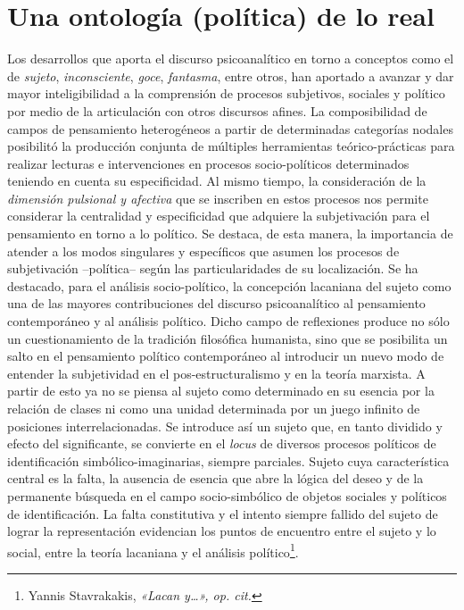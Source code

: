 \section{Una ontología (política) de lo real}

Los desarrollos que aporta el discurso psicoanalítico en torno a conceptos como el de \emph{sujeto}, \emph{inconsciente}, \emph{goce}, \emph{fantasma}, entre otros, han aportado a avanzar y dar mayor inteligibilidad a la comprensión de procesos subjetivos, sociales y político por medio de la articulación con otros discursos afines. La composibilidad de campos de pensamiento heterogéneos a partir de determinadas categorías nodales posibilitó la producción conjunta de múltiples herramientas teórico-prácticas para realizar lecturas e intervenciones en procesos socio-políticos determinados teniendo en cuenta su especificidad. Al mismo tiempo, la consideración de la \emph{dimensión pulsional y afectiva} que se inscriben en estos procesos nos permite considerar la centralidad y especificidad que adquiere la subjetivación para el pensamiento en torno a lo político. Se destaca, de esta manera, la importancia de atender a los modos singulares y específicos que asumen los procesos de subjetivación --política-- según las particularidades de su localización. Se ha destacado, para el análisis socio-político, la concepción lacaniana del sujeto como una de las mayores contribuciones del discurso psicoanalítico al pensamiento contemporáneo y al análisis político. Dicho campo de reflexiones produce no sólo un cuestionamiento de la tradición filosófica humanista, sino que se posibilita un salto en el pensamiento político contemporáneo al introducir un nuevo modo de entender la subjetividad en el pos-estructuralismo y en la teoría marxista. A partir de esto ya no se piensa al sujeto como determinado en su esencia por la relación de clases ni como una unidad determinada por un juego infinito de posiciones interrelacionadas. Se introduce así un sujeto que, en tanto dividido y efecto del significante, se convierte en el \emph{locus} de diversos procesos políticos de identificación simbólico-imaginarias, siempre parciales. Sujeto cuya característica central es la falta, la ausencia de esencia que abre la lógica del deseo y de la permanente búsqueda en el campo socio-simbólico de objetos sociales y políticos de identificación. La falta constitutiva y el intento siempre fallido del sujeto de lograr la representación evidencian los puntos de encuentro entre el sujeto y lo social, entre la teoría lacaniana y el análisis político\footnote{Yannis Stavrakakis, \emph{«Lacan y\ldots», op. cit.}}.

